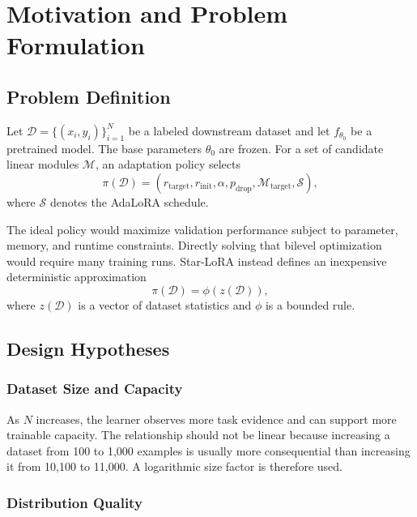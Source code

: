 \chapter{Motivation and Problem Formulation}
\label{chap:motivation}

\section{Problem Definition}

Let $\mathcal{D}=\{(x_i,y_i)\}_{i=1}^{N}$ be a labeled downstream dataset and let
$f_{\theta_0}$ be a pretrained model. The base parameters $\theta_0$ are frozen. For a set of
candidate linear modules $\mathcal{M}$, an adaptation policy selects
\begin{equation}
  \pi(\mathcal{D}) =
  \left(r_{\mathrm{target}}, r_{\mathrm{init}},
  \alpha, p_{\mathrm{drop}}, \mathcal{M}_{\mathrm{target}}, \mathcal{S}\right),
  \label{eq:policy-output}
\end{equation}
where $\mathcal{S}$ denotes the AdaLoRA schedule.

The ideal policy would maximize validation performance subject to parameter, memory, and runtime
constraints. Directly solving that bilevel optimization would require many training runs.
Star-LoRA instead defines an inexpensive deterministic approximation
\begin{equation}
  \pi(\mathcal{D}) = \phi(z(\mathcal{D})),
\end{equation}
where $z(\mathcal{D})$ is a vector of dataset statistics and $\phi$ is a bounded rule.

\section{Design Hypotheses}

\subsection{Dataset Size and Capacity}

As $N$ increases, the learner observes more task evidence and can support more trainable capacity.
The relationship should not be linear because increasing a dataset from 100 to 1,000 examples is
usually more consequential than increasing it from 10,100 to 11,000. A logarithmic size factor is
therefore used.

\subsection{Distribution Quality}

